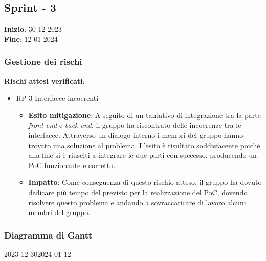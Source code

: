\subsection{Sprint - 3}
\textbf{Inizio}: 30-12-2023 \\
\textbf{Fine}: 12-01-2024

\subsubsection{Gestione dei rischi}
\textbf{Rischi attesi verificati}:

\begin{itemize}
	\item RP-3 Interfacce incoerenti
	\begin{itemize}
		\item \textbf{Esito mitigazione}: A seguito di un tantativo di integrazione tra la parte \textit{front-end} e \textit{back-end}, il gruppo ha riscontrato delle incoerenze tra le interfacce.
		Attraverso un dialogo interno i membri del gruppo hanno trovato una soluzione al problema. L'esito è risultato soddisfacente poiché alla fine si è riusciti a integrare le due 
		parti con successo, producendo un PoC funzionante e corretto.

		\item \textbf{Impatto}: Come conseguenza di questo rischio atteso, il gruppo ha dovuto dedicare più tempo del previsto per la realizzazione del PoC, dovendo risolvere 
		questo problema e andando a sovraccaricare di lavoro alcuni membri del gruppo.
	\end{itemize}
\end{itemize}  
\subsubsection{Diagramma di Gantt}

\begin{ganttchart}[
		x unit=0.6cm, %
		y unit chart=0.6cm,
		bar/.style={fill=blue!50},
		bar height=0.5,
		time slot format=isodate,
		time slot unit=day,
		vgrid,
		today=2024-01-8,
		today rule/.style={draw=red, ultra thick}
	]{2023-12-30}{2024-01-12}
	 \\
	 \\
	 \\
	 \\
	 \\
\end{ganttchart}

